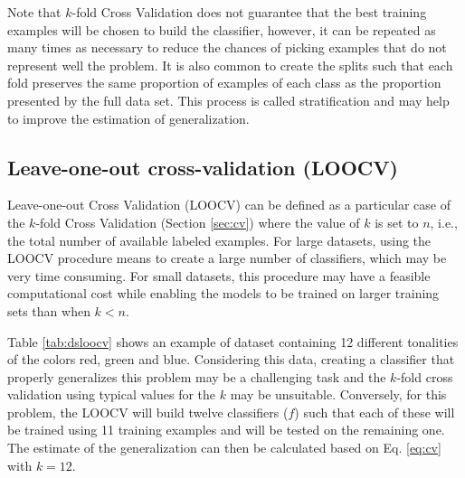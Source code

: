 

Note that $k$-fold Cross Validation does not guarantee that the best training examples will be chosen to build the classifier, however, it can be repeated as many times as necessary to reduce the chances of picking examples that do not represent well the problem.  It is also common to create the splits such that each fold preserves the same proportion of examples of each class as the proportion presented by the full data set. This process is called stratification and may help to improve the estimation of generalization.   




\subsection{Leave-one-out cross-validation (LOOCV)}
\label{sec:loocv}

Leave-one-out Cross Validation (LOOCV) can be defined as a particular case of the $k$-fold Cross Validation (Section \ref{sec:cv}) where the value of $k$ is set to $n$, i.e., the total number of available labeled examples. For large datasets, using the LOOCV procedure means to create a large number of classifiers, which may be very time consuming. For small datasets, this procedure may have a feasible computational cost while enabling the models to be trained on larger training sets than when $k<n$. 

Table \ref{tab:dsloocv} shows an example of dataset containing 12 different tonalities of the colors red, green and blue. Considering this data, creating a classifier that properly generalizes this problem may be a challenging task and the $k$-fold cross validation using typical values for the $k$ may be unsuitable. Conversely, for this problem, the LOOCV will build twelve classifiers ($f$) such that each of these will be trained using 11 training examples and will be tested on the remaining one. The estimate of the generalization can then be calculated based on Eq. \ref{eq:cv} with $k=12$. 




